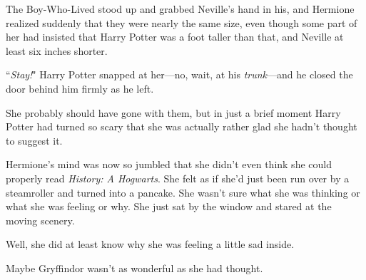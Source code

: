 The Boy-Who-Lived stood up and grabbed Neville's hand in his, and Hermione realized suddenly that they were nearly the same size, even though some part of her had insisted that Harry Potter was a foot taller than that, and Neville at least six inches shorter.

``\emph{Stay!}" Harry Potter snapped at her---no, wait, at his \emph{trunk}---and he closed the door behind him firmly as he left.

She probably should have gone with them, but in just a brief moment Harry Potter had turned so scary that she was actually rather glad she hadn't thought to suggest it.

Hermione's mind was now so jumbled that she didn't even think she could properly read \emph{History: A Hogwarts}. She felt as if she'd just been run over by a steamroller and turned into a pancake. She wasn't sure what she was thinking or what she was feeling or why. She just sat by the window and stared at the moving scenery.

Well, she did at least know why she was feeling a little sad inside.

Maybe Gryffindor wasn't as wonderful as she had thought.

